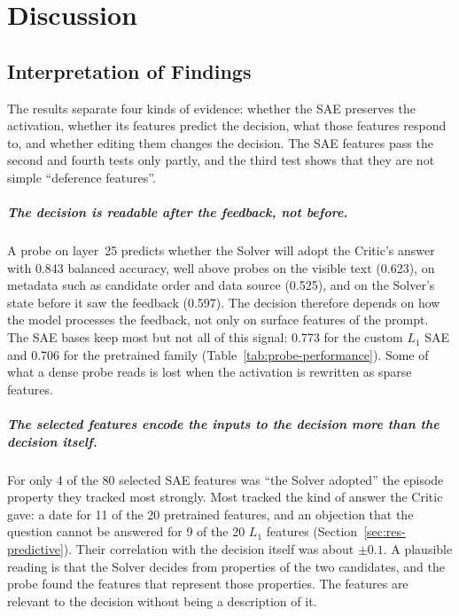 \chapter{Discussion}
\label{chap:discussion}

\section{Interpretation of Findings}

The results separate four kinds of evidence: whether the SAE preserves the
activation, whether its features predict the decision, what those features
respond to, and whether editing them changes the decision. The SAE features
pass the second and fourth tests only partly, and the third test shows that
they are not simple ``deference features''.

\paragraph{The decision is readable after the feedback, not before.} A probe
on layer~25 predicts whether the Solver will adopt the Critic's answer with
0.843 balanced accuracy, well above probes on the visible text (0.623), on
metadata such as candidate order and data source (0.525), and on the Solver's
state before it saw the feedback (0.597). The decision therefore depends on
how the model processes the feedback, not only on surface features of the
prompt. The SAE bases keep most but not all of this signal: 0.773 for the
custom $L_1$ SAE and 0.706 for the pretrained family
(Table~\ref{tab:probe-performance}). Some of what a dense probe reads is lost
when the activation is rewritten as sparse features.

\paragraph{The selected features encode the inputs to the decision more than
the decision itself.} For only 4 of the 80 selected SAE features was ``the
Solver adopted'' the episode property they tracked most strongly. Most
tracked the kind of answer the Critic gave: a date for 11 of the 20 pretrained
features, and an objection that the question cannot be answered for 9 of the
20 $L_1$ features (Section~\ref{sec:res-predictive}). Their correlation with
the decision itself was about $\pm0.1$. A plausible reading is that the Solver
decides from properties of the two candidates, and the probe found the
features that represent those properties. The features are relevant to the
decision without being a description of it.

